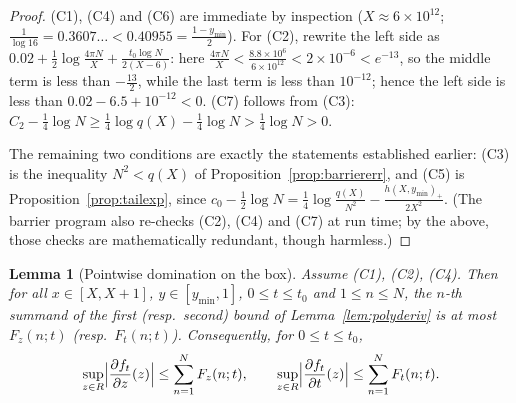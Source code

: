 \documentclass[11pt]{article}
\newtheorem{lemma}[theorem]{Lemma}
\theoremstyle{definition}
\begin{document}
\begin{proof}
(C1), (C4) and (C6) are immediate by inspection
($X\approx6\times10^{12}$;
$\frac1{\log16}=0.3607\ldots<0.40955=\frac{1-y_{\min}}2$). For
(C2), rewrite the left side as
$0.02+\frac12\log\frac{4\pi N}{X}
+\frac{t_0\log N}{2(X-6)}$: here
$\frac{4\pi N}{X}<\frac{8.8\times10^6}{6\times10^{12}}
<2\times10^{-6}<e^{-13}$, so the middle term is less than
$-\frac{13}2$, while the last term is less than $10^{-12}$; hence
the left side is less than $0.02-6.5+10^{-12}<0$. (C7) follows
from (C3): $C_2-\frac14\log N\ge\frac14\log q(X)-\frac14\log N
>\frac14\log N>0$.

The remaining two conditions are exactly the statements
established earlier: (C3) is the inequality $N^2<q(X)$ of
Proposition~\ref{prop:barriererr}, and (C5) is
Proposition~\ref{prop:tailexp}, since
$c_0-\frac12\log N
=\frac14\log\frac{q(X)}{N^2}-\frac{h(X,y_{\min})_+}{2X^2}$.
(The barrier program also re-checks (C2), (C4) and (C7) at run
time; by the above, those checks are mathematically redundant,
though harmless.)
\end{proof}

\begin{lemma}[Pointwise domination on the box]\label{lem:dompoint}
Assume (C1), (C2), (C4). Then for all $x\in[X,X+1]$,
$y\in[y_{\min},1]$, $0\le t\le t_0$ and $1\le n\le N$, the $n$-th
summand of the first (resp.\ second) bound of
Lemma~\ref{lem:polyderiv} is at most $F_z(n;t)$ (resp.\
$F_t(n;t)$). Consequently, for $0\le t\le t_0$,
\[
\sup_{z\in R}\Bigl|\frac{\partial f_t}{\partial z}(z)\Bigr|
\le\sum_{n=1}^{N}F_z(n;t),
\qquad
\sup_{z\in R}\Bigl|\frac{\partial f_t}{\partial t}(z)\Bigr|
\le\sum_{n=1}^{N}F_t(n;t).
\]
\end{lemma}
\end{document}

